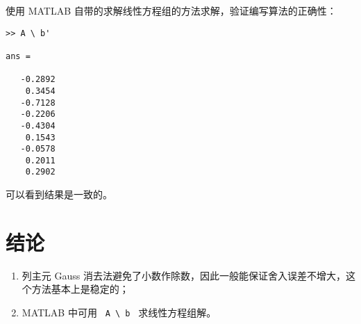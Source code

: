 使用 MATLAB 自带的求解线性方程组的方法求解，验证编写算法的正确性：

\begin{lstlisting}[style = null]
>> A \ b'

ans =

   -0.2892
    0.3454
   -0.7128
   -0.2206
   -0.4304
    0.1543
   -0.0578
    0.2011
    0.2902
\end{lstlisting}

可以看到结果是一致的。

\section{结论}

\begin{enumerate}
    \item 列主元 Gauss 消去法避免了小数作除数，因此一般能保证舍入误差不增大，这个方法基本上是稳定的；

    \item MATLAB 中可用 \lstinline[style = null]| A \ b | 求线性方程组解。
\end{enumerate}

